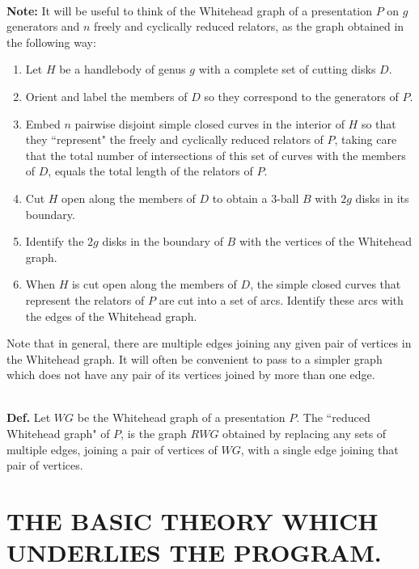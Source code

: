 \documentclass[12pt]{amsart}
\newcommand{\definition}{\ \\ \noindent \textbf{Def.} }
\newcommand{\note}{\ \\ \noindent  \textbf{Note:} }
\begin{document}
\note   It will be useful to think of the Whitehead graph of a presentation $P$ on $g$
        generators and $n$ freely and cyclically reduced relators, as the graph obtained in the
        following way:
        \begin{enumerate}
                \item      Let $H$ be a handlebody of genus $g$ with a complete set of cutting disks $D$.
                \item     Orient and label the members of $D$ so they correspond to the generators of $P$.
                \item      Embed $n$ pairwise disjoint simple closed curves in the interior of $H$ so that
                        they ``represent" the freely and cyclically reduced relators of $P$, taking care
                        that the total number of intersections of this set of curves with the members
                        of $D$, equals the total length of the relators of $P$.
                \item     Cut $H$ open along the members of $D$ to obtain a 3-ball $B$ with $2g$ disks in its
                        boundary.
                \item     Identify the $2g$ disks in the boundary of $B$ with the vertices of the Whitehead
                        graph.
                \item     When $H$ is cut open along the members of $D$, the simple closed curves that
                        represent the relators of $P$ are cut into a set of arcs. Identify these arcs
                        with the edges of the Whitehead graph.
        \end{enumerate}
        Note that in general, there are multiple edges joining any given pair of vertices in
        the Whitehead graph. It will often be convenient to pass to a simpler graph which does
        not have any pair of its vertices joined by more than one edge.
        
\definition     Let $WG$ be the Whitehead graph of a presentation $P$. The ``reduced Whitehead graph"
        of $P$, is the graph $RWG$ obtained by replacing any sets of multiple edges, joining a pair
        of vertices of $WG$, with a single edge joining that pair of vertices.

                                        
                                                
\section{THE BASIC THEORY WHICH UNDERLIES THE PROGRAM.}
                                                
\end{document}
